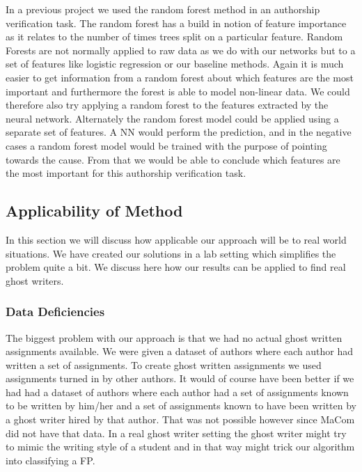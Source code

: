 In a previous project \citep{US} we used the random forest method in an
authorship verification task. The random forest has a build in notion of feature
importance as it relates to the number of times trees split on a particular
feature. Random Forests are not normally applied to raw data as we do with our
networks but to a set of features like logistic regression or our baseline
methods. Again it is much easier to get information from a random forest about
which features are the most important and furthermore the forest is able to
model non-linear data. We could therefore also try applying a random forest to
the features extracted by the neural network. Alternately the random forest
model could be applied using a separate set of features. A \gls{NN} would
perform the prediction, and in the negative cases a random forest model would
be trained with the purpose of pointing towards the cause. From that we would
be able to conclude which features are the most important for this authorship
verification task.

\subsection{Applicability of Method}\label{sec:app_of_method}

In this section we will discuss how applicable our approach will be to real
world situations. We have created our solutions in a lab setting which
simplifies the problem quite a bit. We discuss here how our results can be
applied to find real ghost writers.


\subsubsection{Data Deficiencies}

The biggest problem with our approach is that we had no actual ghost written
assignments available. We were given a dataset of authors where each author
had written a set of assignments. To create ghost written assignments we used
assignments turned in by other authors. It would of course have been better if
we had had a dataset of authors where each author had a set of assignments known
to be written by him/her and a set of assignments known to have been written by
a ghost writer hired by that author. That was not possible however since MaCom
did not have that data. In a real ghost writer setting the ghost writer might
try to mimic the writing style of a student and in that way might trick our
algorithm into classifying a \gls{FP}.

